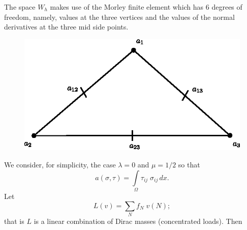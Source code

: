 The space $W_h$ makes use of the Morley finite element which has 6
degrees of freedom, namely, values at the three vertices and the
values of the normal derivatives at the three mid side points.
\begin{figure}[H]
\centering
\includegraphics{figure/fig7.2.eps}
\caption{}\label{fig7.2}
\end{figure}\pageoriginale

We consider, for simplicity, the case $\lambda=0$ and $\mu=1/2$ so
that
$$
a(\sigma,\tau)=\int\limits_\Omega \tau_{ij}\;\sigma_{ij}\,dx.
$$
Let
$$
L(v)=\sum\limits_N f_N\;v(N);
$$
that is $L$ is a linear combination of Dirac masses (concentrated
loads). Then 

